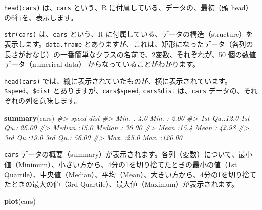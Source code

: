 \documentclass[
  xelatex, ja=standard]{bxjsbook}
\newenvironment{Shaded}{\begin{snugshade}}{\end{snugshade}}
\newcommand{\CommentTok}[1]{\textcolor[rgb]{0.56,0.35,0.01}{\textit{#1}}}
\newcommand{\FunctionTok}[1]{\textcolor[rgb]{0.13,0.29,0.53}{\textbf{#1}}}
\newcommand{\NormalTok}[1]{#1}
\theoremstyle{definition}
\theoremstyle{definition}
\theoremstyle{definition}
\theoremstyle{definition}
\theoremstyle{remark}
\begin{document}
\texttt{head(cars)} は、\texttt{cars} という、R に付属している、データの、最初（頭 head）の6行を、表示します。

\begin{Shaded}
\end{Shaded}

\texttt{str(cars)} は、\texttt{cars} という、R に付属している、データの構造（structure）を表示します。\texttt{data.frame} とありますが、これは、矩形になったデータ（各列の長さがおなじ）の一番簡単なクラスの名前で、2変数、それぞれが、50 個の数値データ（numerical data） からなっていることがわかります。

\texttt{head(cars)} では、縦に表示されていたものが、横に表示されています。\texttt{\$speed}、\texttt{\$dist} とありますが、\texttt{cars\$speed}, \texttt{cars\$dist} は、\texttt{cars} データの、それぞれの列を意味します。

\begin{Shaded}
\begin{Highlighting}[]
\FunctionTok{summary}\NormalTok{(cars)}
\CommentTok{\#\textgreater{}      speed           dist       }
\CommentTok{\#\textgreater{}  Min.   : 4.0   Min.   :  2.00  }
\CommentTok{\#\textgreater{}  1st Qu.:12.0   1st Qu.: 26.00  }
\CommentTok{\#\textgreater{}  Median :15.0   Median : 36.00  }
\CommentTok{\#\textgreater{}  Mean   :15.4   Mean   : 42.98  }
\CommentTok{\#\textgreater{}  3rd Qu.:19.0   3rd Qu.: 56.00  }
\CommentTok{\#\textgreater{}  Max.   :25.0   Max.   :120.00}
\end{Highlighting}
\end{Shaded}

\texttt{cars} データの概要（summary）が表示されます。各列（変数）について、最小値（Minimum）、小さい方から、4分の1を切り捨てたときの最小の値（1st Quartile）、中央値（Median）、平均（Mean）、大きい方から、4分の1を切り捨てたときの最大の値（3rd Quartile）、最大値（Maximum）が表示されます。

\begin{Shaded}
\begin{Highlighting}[]
\FunctionTok{plot}\NormalTok{(cars)}
\end{Highlighting}
\end{Shaded}
\end{document}
